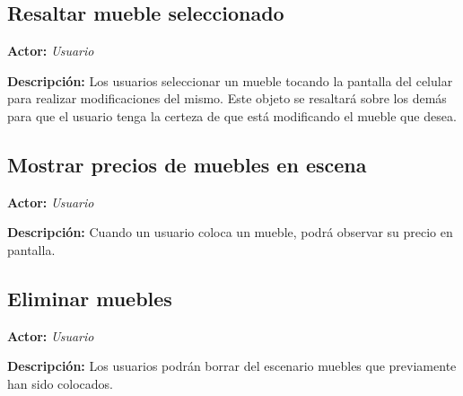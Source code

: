 \subsection{Resaltar mueble seleccionado}
\textbf{Actor:} \textit{Usuario} \par
\textbf{Descripción:} Los usuarios seleccionar un mueble tocando la pantalla del celular para realizar modificaciones del mismo. Este objeto se resaltará sobre los demás para que el usuario tenga la certeza de que está modificando el mueble que desea.

\subsection{Mostrar precios de muebles en escena}
\textbf{Actor:} \textit{Usuario} \par
\textbf{Descripción:} Cuando un usuario coloca un mueble, podrá observar su precio en pantalla.

\subsection{Eliminar muebles}
\textbf{Actor:} \textit{Usuario} \par
\textbf{Descripción:} Los usuarios podrán borrar del escenario muebles que previamente han sido colocados. 
